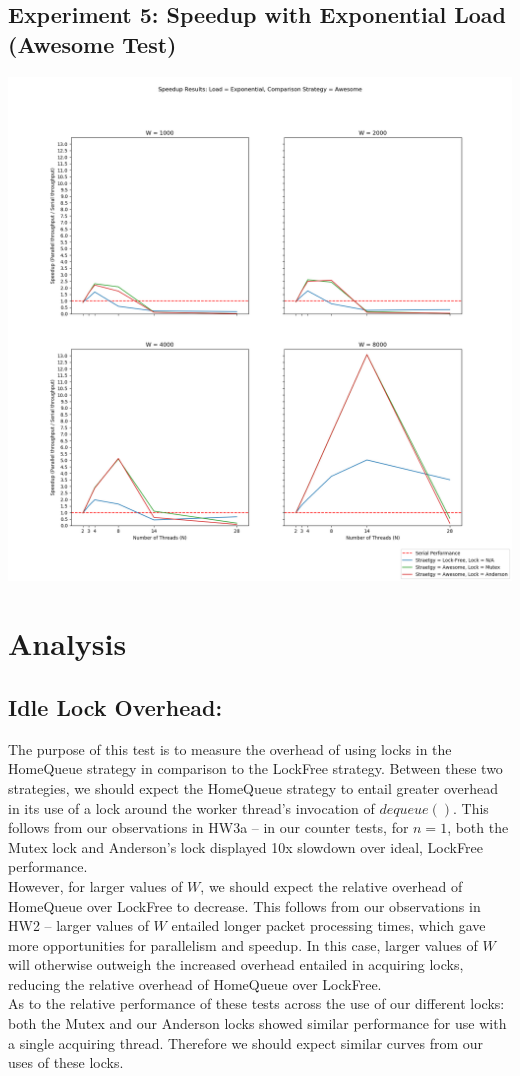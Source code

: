 \documentclass[]{article}
\begin{document}
\subsection{Experiment 5: Speedup with Exponential Load (Awesome Test)}
\includegraphics[scale=0.5]{graphs/speedup_f:A.png}\\

\section{Analysis}

\subsection{Idle Lock Overhead:}
The purpose of this test is to measure the overhead of using locks in the HomeQueue strategy in comparison to the LockFree strategy. Between these two strategies, we should expect the HomeQueue strategy to entail greater overhead in its use of a lock around the worker thread's invocation of $dequeue()$. This follows from our observations in HW3a -- in our counter tests, for $n = 1$, both the Mutex lock and Anderson's lock displayed 10x slowdown over ideal, LockFree performance.
\\
However, for larger values of $W$, we should expect the relative overhead of HomeQueue over LockFree to decrease. This follows from our observations in HW2 -- larger values of $W$ entailed longer packet processing times, which gave more opportunities for parallelism and speedup. In this case, larger values of $W$ will otherwise outweigh the increased overhead entailed in acquiring locks, reducing the relative overhead of HomeQueue over LockFree.
\\
As to the relative performance of these tests across the use of our different locks: both the Mutex and our Anderson locks showed similar performance for use with a single acquiring thread. Therefore we should expect similar curves from our uses of these locks.
\end{document}

